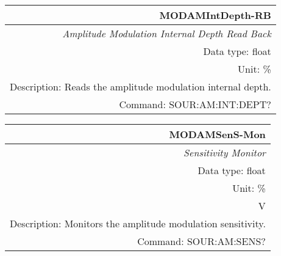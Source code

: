 \documentclass[openany]{article}
\begin{document}
		\begin{tabular}{N}
			\hline
			\bfseries MODAMIntDepth-RB \\ \hline
			\emph{Amplitude Modulation Internal Depth Read Back} \\
			Data type: float \\
			Unit: \% \\
			Description: Reads the amplitude modulation internal depth. \\
			Command: SOUR:AM:INT:DEPT? \\

		\end{tabular}
%
		\begin{tabular}{N}
			\hline
			\bfseries MODAMSenS-Mon \\ \hline
			\emph{Sensitivity Monitor} \\
			Data type: float \\
			Unit: \%\\V \\
			Description: Monitors the amplitude modulation sensitivity. \\
			Command: SOUR:AM:SENS? \\

		\end{tabular}
%
\end{document}

